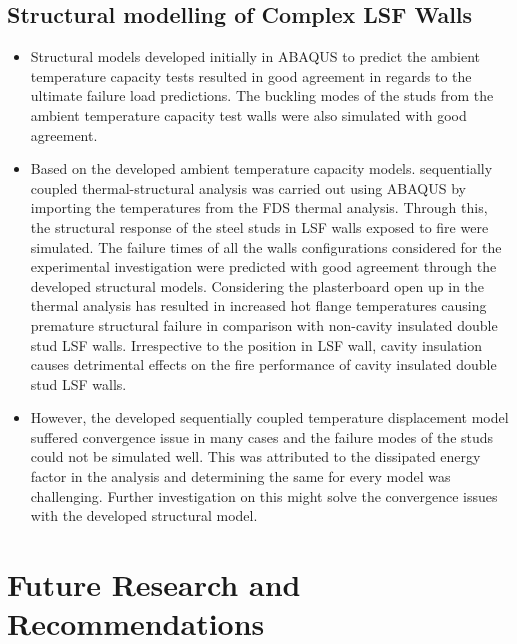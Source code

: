 \subsection{Structural modelling of Complex LSF Walls}
\begin{itemize}
	\item Structural models developed initially in ABAQUS to predict the ambient temperature capacity tests resulted in good agreement in regards to the ultimate failure load predictions. The buckling modes of the studs from the ambient temperature capacity test walls were also simulated with good agreement.
	\item Based on the developed ambient temperature capacity models. sequentially coupled thermal-structural analysis was carried out using ABAQUS by importing the temperatures from the FDS thermal analysis. Through this, the structural response of the steel studs in LSF walls exposed to fire were simulated. The failure times of all the walls configurations considered for the experimental investigation were predicted with good agreement through the developed structural models. Considering the plasterboard open up in the thermal analysis has resulted in increased hot flange temperatures causing premature structural failure in comparison with non-cavity insulated double stud LSF walls. Irrespective to the position in LSF wall, cavity insulation causes detrimental effects on the fire performance of cavity insulated double stud LSF walls. 
	\item However, the developed sequentially coupled temperature displacement model suffered convergence issue in many cases and the failure modes of the studs could not be simulated well. This was attributed to the dissipated energy factor in the analysis and determining the same for every model was challenging. Further investigation on this might solve the convergence issues with the developed structural model.
\end{itemize}

\section{Future Research and Recommendations}

